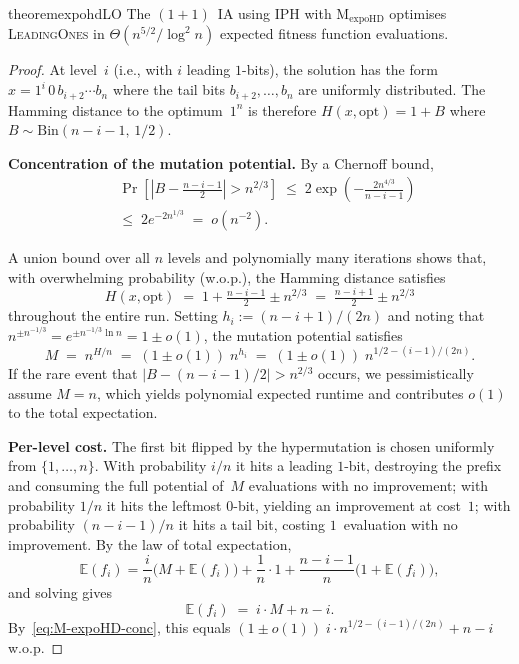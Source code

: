 \documentclass[lettersize,journal]{IEEEtran}
\newcommand{\EE}{\mathbb{E}}
\newcommand{\oneoneIA}{$(1+1)$~IA}
\newcommand{\expoHD}{M$_{\text{expoHD}}$}
\newcommand{\IPHfcm}{IPH}
\begin{document}
 



\setcounter{theorem}{4}
\begin{restatable}{theorem}{expohdLO}\label{thm:expohdLO}
The {\oneoneIA } using \IPHfcm{} with {\expoHD } optimises
\textsc{LeadingOnes} in $\Theta(n^{5/2}/\log^2 n)$ expected fitness function
evaluations.
\end{restatable}

\begin{proof}
At level~$i$ (i.e., with $i$ leading $1$-bits), the solution has the form
$x = 1^{i}\,0\,b_{i+2}\cdots b_n$ where the tail bits $b_{i+2},\dots,b_n$
are uniformly distributed.
The Hamming distance to the optimum~$1^n$ is therefore
$H(x,\text{opt}) = 1 + B$ where $B\sim\mathrm{Bin}(n-i-1,\,1/2)$.

\medskip
\noindent\textbf{Concentration of the mutation potential.}
By a Chernoff bound,
\begin{align*}
&\Pr\!\left[\left|B - \tfrac{n-i-1}{2}\right| > n^{2/3}\right]
\;\le\; 2\exp\!\left(-\frac{2n^{4/3}}{n-i-1}\right)
\\\;&\le\; 2e^{-2n^{1/3}}
\;=\; o(n^{-2}).
\end{align*}

A union bound over all $n$ levels and polynomially many iterations shows that,
with overwhelming probability (w.o.p.), the Hamming distance satisfies
\[
H(x,\text{opt})
\;=\; 1 + \tfrac{n-i-1}{2} \pm n^{2/3}
\;=\; \tfrac{n-i+1}{2} \pm n^{2/3}
\]
throughout the entire run.
Setting $h_i := (n-i+1)/(2n)$ and noting that
$n^{\pm n^{-1/3}} = e^{\pm n^{-1/3}\ln n} = 1 \pm o(1)$,
the mutation potential satisfies
\begin{equation}\label{eq:M-expoHD-conc}
M \;=\; n^{H/n}
  \;=\; (1\pm o(1))\;n^{h_i}
  \;=\; (1\pm o(1))\;n^{1/2-(i-1)/(2n)}.
\end{equation}
If the rare event that $|B - (n-i-1)/2| > n^{2/3}$ occurs, we
pessimistically assume $M=n$, which yields polynomial expected runtime and
contributes $o(1)$ to the total expectation.

\medskip
\noindent\textbf{Per-level cost.}
The first bit flipped by the hypermutation is chosen uniformly from
$\{1,\dots,n\}$.  With probability $i/n$ it hits a leading $1$-bit,
destroying the prefix and consuming the full potential of~$M$ evaluations
with no improvement; with probability $1/n$ it hits the leftmost $0$-bit,
yielding an improvement at cost~$1$; with probability $(n-i-1)/n$ it hits
a tail bit, costing $1$~evaluation with no improvement.
By the law of total expectation,
\[
\EE(f_i)
= \frac{i}{n}\bigl(M+\EE(f_i)\bigr)
  +\frac{1}{n}\cdot 1
  +\frac{n-i-1}{n}\bigl(1+\EE(f_i)\bigr),
\]
and solving gives
\begin{equation}\label{eq:Efi-expoHD}
\EE(f_i) \;=\; i\cdot M + n - i.
\end{equation}
By~\eqref{eq:M-expoHD-conc}, this equals
$(1\pm o(1))\;i\cdot n^{1/2-(i-1)/(2n)} + n - i$ w.o.p.


\end{proof}
\end{document}
